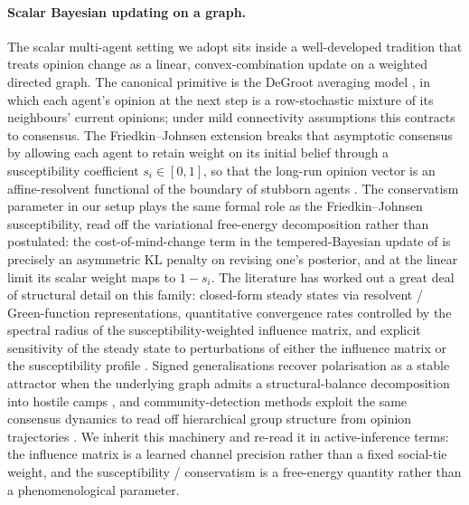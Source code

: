 \paragraph{Scalar Bayesian updating on a graph.}
The scalar multi-agent setting we adopt sits inside a well-developed
tradition that treats opinion change as a linear, convex-combination
update on a weighted directed graph. The canonical primitive is the
DeGroot averaging model \citep{Boudourides2026_7}, in which each
agent's opinion at the next step is a row-stochastic mixture of its
neighbours' current opinions; under mild connectivity assumptions this
contracts to consensus. The Friedkin--Johnsen extension breaks that
asymptotic consensus by allowing each agent to retain weight on its
initial belief through a susceptibility coefficient
$s_i \in [0,1]$, so that the long-run opinion vector is an
affine-resolvent functional of the boundary of stubborn agents
\citep{Boudourides2026_7}. The conservatism parameter in our setup
plays the same formal role as the Friedkin--Johnsen susceptibility,
read off the variational free-energy decomposition rather than
postulated: the cost-of-mind-change term in the tempered-Bayesian
update of \citet{hylandAlbarracin2025MindChange} is precisely an
asymmetric KL penalty on revising one's posterior, and at the linear
limit its scalar weight maps to $1 - s_i$. The literature has worked
out a great deal of structural detail on this family: closed-form
steady states via resolvent / Green-function representations,
quantitative convergence rates controlled by the spectral radius of
the susceptibility-weighted influence matrix, and explicit sensitivity
of the steady state to perturbations of either the influence matrix or
the susceptibility profile \citep{Boudourides2026_7}. Signed
generalisations recover polarisation as a stable attractor when the
underlying graph admits a structural-balance decomposition into
hostile camps \citep{Proskurnikov2015_6}, and community-detection
methods exploit the same consensus dynamics to read off hierarchical
group structure from opinion trajectories \citep{Ren2020_13}. We
inherit this machinery and re-read it in active-inference terms: the
influence matrix is a learned channel precision rather than a fixed
social-tie weight, and the susceptibility / conservatism is a
free-energy quantity rather than a phenomenological parameter.

